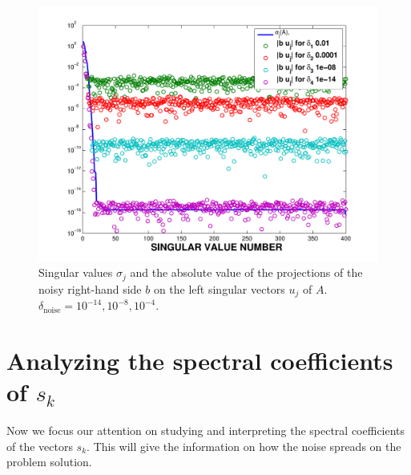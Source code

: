 \documentclass[11pt]{amsart}
\begin{document}
\begin{figure}[htb] 
  \begin{center}
    \includegraphics[width=.55\linewidth]{../presentation/figures/picard}
  \end{center}
\caption{Singular values $\sigma_{j}$ and the absolute value of the
projections of the noisy right-hand side $b$ on the left singular vectors 
$u_{j}$ of $A$. $\delta_{\text{noise}} = 10^{-14}, 10^{-8}, 10^{-4}$.}
\label{fig:picard}
\end{figure}

\section{Analyzing the spectral coefficients of $s_{k}$}
Now we focus our attention on studying and interpreting the spectral 
coefficients of the vectors $s_{k}$. This will give the information on how the
noise spreads on the problem solution.
\end{document}
